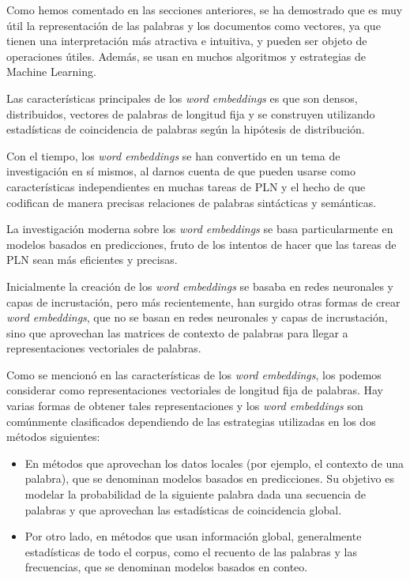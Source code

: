 \documentclass[titlepage]{article}
\begin{document}
Como hemos comentado en las secciones anteriores, se ha demostrado que es muy útil la representación de las palabras y los documentos como vectores, ya que tienen una interpretación más atractiva e intuitiva, y pueden ser objeto de operaciones útiles. Además, se usan en muchos algoritmos y estrategias de Machine Learning.

Las características principales de los \textit{word embeddings} es que son densos, distribuidos, vectores de palabras de longitud fija y se construyen utilizando estadísticas de coincidencia de palabras según la hipótesis de distribución.

Con el tiempo, los \textit{word embeddings} se han convertido en un tema de investigación en sí mismos, al darnos cuenta de que pueden usarse como características independientes en muchas tareas de PLN y el hecho de que codifican de manera precisas relaciones de palabras sintácticas y semánticas.

La investigación moderna sobre los \textit{word embeddings} se basa particularmente en modelos basados en predicciones, fruto de los intentos de hacer que las tareas de PLN sean más eficientes y precisas. 

Inicialmente la creación de los \textit{word embeddings} se basaba en redes neuronales y capas de incrustación, pero más recientemente, han surgido otras formas de crear \textit{word embeddings}, que no se basan en redes neuronales y capas de incrustación, sino que aprovechan las matrices de contexto de palabras para llegar a representaciones vectoriales de palabras. 

Como se mencionó en las características de los \textit{word embeddings}, los podemos considerar como representaciones vectoriales de longitud fija de palabras. Hay varias formas de obtener tales representaciones y los \textit{word embeddings} son comúnmente clasificados dependiendo de las estrategias utilizadas en los dos métodos siguientes:

\begin{itemize}
	\item En métodos que aprovechan los datos locales (por ejemplo, el contexto de una palabra), que se denominan modelos basados en predicciones. Su objetivo es modelar la probabilidad de la siguiente palabra dada una secuencia de palabras y que aprovechan las estadísticas de coincidencia global.
	\item Por otro lado, en métodos que usan información global, generalmente estadísticas de todo el corpus, como el recuento de las palabras y las frecuencias, que se denominan modelos basados en conteo. 
\end{itemize}
\end{document}
